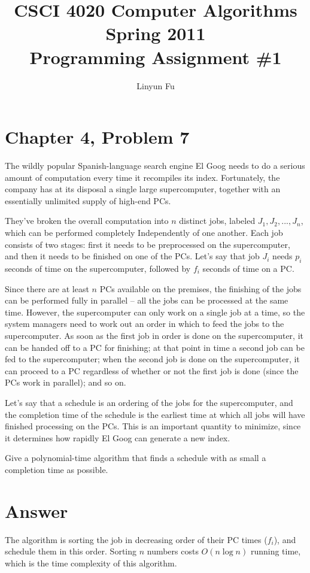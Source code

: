 \documentclass[12pt,letterpaper]{article}
\author{Linyun Fu}
\title{CSCI 4020 Computer Algorithms Spring 2011\\
Programming Assignment \#1}
\begin{document}
\maketitle
\section*{Chapter 4, Problem 7}
The wildly popular Spanish-language search engine El Goog needs to do
a serious amount of computation every time it recompiles its index. Fortunately,
the company has at its disposal a single large supercomputer,
together with an essentially unlimited supply of high-end PCs.

They've broken the overall computation into $n$ distinct jobs, labeled
$J_1, J_2, ..., J_n$, which can be performed completely Independently of one
another. Each job consists of two stages: first it needs to be preprocessed
on the supercomputer, and then it needs to be finished on one of the
PCs. Let's say that job $J_i$ needs $p_i$ seconds of time on the supercomputer,
followed by $f_i$ seconds of time on a PC.

Since there are at least $n$ PCs available on the premises, the finishing
of the jobs can be performed fully in parallel -- all the jobs can be processed
at the same time. However, the supercomputer can only work on
a single job at a time, so the system managers need to work out an order
in which to feed the jobs to the supercomputer. As soon as the first job
in order is done on the supercomputer, it can be handed off to a PC for
finishing; at that point in time a second job can be fed to the supercomputer;
when the second job is done on the supercomputer, it can proceed
to a PC regardless of whether or not the first job is done (since the PCs
work in parallel); and so on.

Let's say that a schedule is an ordering of the jobs for the supercomputer,
and the completion time of the schedule is the earliest time at
which all jobs will have finished processing on the PCs. This is an important
quantity to minimize, since it determines how rapidly El Goog can
generate a new index.

Give a polynomial-time algorithm that finds a schedule with as small
a completion time as possible.

\section*{Answer}
The algorithm is sorting the job in decreasing order of their PC times ($f_i$), and schedule them in this order. Sorting $n$ numbers costs $O(n\log n)$ running time, which is the time complexity of this algorithm.
\end{document}

